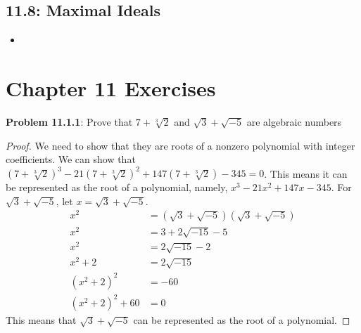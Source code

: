 \documentclass[12pt]{article}
\begin{document}
\subsection*{11.8: Maximal Ideals}
\begin{itemize}
  \item 
\end{itemize}

\newpage
\section*{Chapter 11 Exercises}
\textbf{Problem 11.1.1}: Prove that $7 + \sqrt[3]{2}$ and $\sqrt{3} + \sqrt{-5}$ are algebraic numbers
\begin{proof}
We need to show that they are roots of a nonzero polynomial with integer coefficients. We can show that $(7 + \sqrt[3]{2})^3 - 21(7 + \sqrt[3]{2})^2 + 147(7 + \sqrt[3]{2}) - 345 = 0$. This means it can be represented as the root of a polynomial, namely, $x^3 - 21x^2 + 147x - 345$. For $\sqrt{3} + \sqrt{-5}$, let $x = \sqrt{3} + \sqrt{-5}$.
\begin{align*}
  x^2 &= (\sqrt{3} + \sqrt{-5})(\sqrt{3} + \sqrt{-5}) \\
  x^2 &= 3 + 2\sqrt{-15} - 5 \\
  x^2 &= 2\sqrt{-15} - 2 \\
  x^2 + 2 &= 2\sqrt{-15} \\
  (x^2 + 2)^2 &= -60 \\
  (x^2 + 2)^2 + 60 &= 0
\end{align*}
This means that $\sqrt{3} + \sqrt{-5}$ can be represented as the root of a polynomial.
\end{proof}
\end{document}
